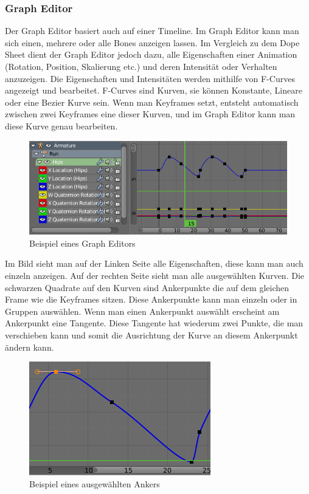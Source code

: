\subsubsection{Graph Editor}
Der Graph Editor basiert auch auf einer Timeline. Im Graph Editor kann man sich einen, mehrere oder alle Bones anzeigen lassen.
Im Vergleich zu dem Dope Sheet dient der Graph Editor jedoch dazu, alle Eigenschaften einer Animation (Rotation, Position, Skalierung etc.)
und deren Intensität oder Verhalten anzuzeigen. Die Eigenschaften und Intensitäten werden mithilfe von F-Curves angezeigt und bearbeitet. F-Curves
sind Kurven, sie können Konstante, Lineare oder eine Bezier Kurve sein.
Wenn man Keyframes setzt, entsteht automatisch zwischen zwei Keyframes eine dieser Kurven, und im Graph Editor kann man diese Kurve genau bearbeiten.
\citep{Blender:FCurves}
\citep{Blender:GraphEditor}

\begin{figure}[H]
                \centering

                \includegraphics[width=.8\textwidth]{images/animation_graph_editor.PNG}
                \caption{Beispiel eines Graph Editors}
\end{figure}

Im Bild sieht man auf der Linken Seite alle Eigenschaften, diese kann man auch einzeln anzeigen. Auf der rechten Seite sieht man alle ausgewählten Kurven.
Die schwarzen Quadrate auf den Kurven sind Ankerpunkte die auf dem gleichen Frame wie die Keyframes sitzen. Diese Ankerpunkte kann man einzeln oder in Gruppen auswählen.
Wenn man einen Ankerpunkt auswählt erscheint am Ankerpunkt eine Tangente.
Diese Tangente hat wiederum zwei Punkte, die man verschieben kann und somit die Ausrichtung der Kurve an diesem Ankerpunkt ändern kann.

\begin{figure}[H]
    \centering

    \includegraphics[width=.8\textwidth]{images/animation_graph_editor_anker.PNG}
    \caption{Beispiel eines ausgewählten Ankers}
\end{figure}

